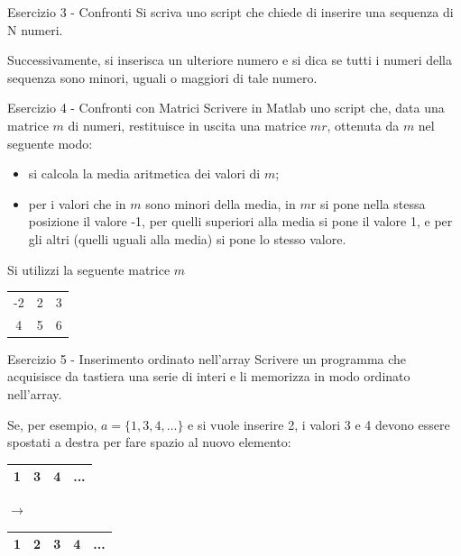 \documentclass[handout]{beamer}
\begin{document}
\begin{frame}{Esercizio 3 - Confronti}
Si scriva uno script che chiede di inserire una sequenza di N numeri.

Successivamente, si inserisca un ulteriore numero e si dica se tutti i numeri della sequenza sono minori, uguali o maggiori di tale numero.
\end{frame}

\begin{frame}{Esercizio 4 - Confronti con Matrici}
Scrivere in Matlab uno script che, data una matrice $m$ di numeri, restituisce in uscita una matrice $mr$, ottenuta da $m$ nel seguente modo:
\begin{itemize}
	\item si calcola la media aritmetica dei valori di $m$;
	\item per i valori che in $m$ sono minori della media, in $m$r si
pone nella stessa posizione il valore -1, per quelli superiori alla media si pone il valore 1, e per gli altri (quelli uguali alla media) si pone lo stesso valore.
\end{itemize}

Si utilizzi la seguente matrice $m$

\centering
\begin{tabular}{|ccc|}
	\hline
	-2&2&3\\
	4&5&6\\
	\hline
\end{tabular}
\end{frame}

\begin{frame}{Esercizio 5 - Inserimento ordinato nell'array}
Scrivere un programma che acquisisce da tastiera una serie di interi e li memorizza in modo ordinato nell’array.

\pause
Se, per esempio, $a = \{1, 3, 4, …\}$ e si vuole inserire 2, i valori 3 e 4 devono essere spostati a destra per fare spazio al nuovo elemento:

\centering
\begin{tabular}{|c|c|c|c|}
	\hline
	1&3&4&...\\
	\hline
\end{tabular}
$\rightarrow$
\begin{tabular}{|c|c|c|c|c|}
	\hline
	1& \alert{2} &3&4&...\\
	\hline
\end{tabular}

\end{frame}
\end{document}
